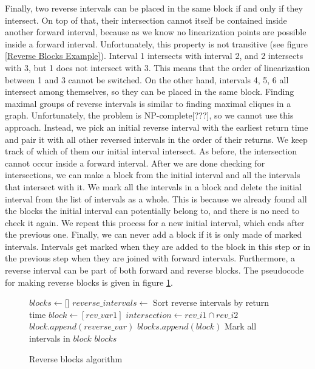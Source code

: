 \documentclass[oneside, a4paper, onecolumn, 10pt]{article}
\begin{document}
\noindent
Finally, two reverse intervals can be placed in the same block if and only if they intersect. On top of that, their intersection cannot itself be contained inside another forward interval, because as we know no linearization points are possible inside a forward interval. Unfortunately, this property is not transitive (see figure \ref{Reverse Blocks Example}). Interval 1 intersects with interval 2, and 2 intersects with 3, but 1 does not intersect with 3. This means that the order of linearization between 1 and 3 cannot be switched. On the other hand, intervals 4, 5, 6 all intersect among themselves, so they can be placed in the same block. Finding maximal groups of reverse intervals is similar to finding maximal cliques in a graph. Unfortunately, the problem is NP-complete[???], so we cannot use this approach.
Instead, we pick an initial reverse interval with the earliest return time and pair it with all other reversed intervals in the order of their returns. We keep track of which of them our initial interval intersect. As before, the intersection cannot occur inside a forward interval. After we are done checking for intersections, we can make a block from the initial interval and all the intervals that intersect with it. We mark all the intervals in a block and delete the initial interval from the list of intervals as a whole. This is because we already found all the blocks the initial interval can potentially belong to, and there is no need to check it again. We repeat this process for a new initial interval, which ends after the previous one. Finally, we can never add a block if it is only made of marked intervals. Intervals get marked when they are added to the block in this step or in the previous step when they are joined with forward intervals. Furthermore, a reverse interval can be part of both forward and reverse blocks. The pseudocode for making reverse blocks is given in figure \ref{Reverse Blocks Algorithm}.
\begin{figure}[h]
  \begin{algorithmic}
    \State $blocks \gets \texttt{[]}$
    \State $reverse\_intervals \gets$ Sort reverse intervals by return time
    \State $block \gets [rev\_var1]$
    \State $intersection \gets rev\_i1 \cap rev\_i2$
    \State $block.append(reverse\_var)$
    \EndIf
    \EndFor
    \State $blocks.append(block)$
    \State Mark all intervals in $block$
    \EndIf
    \EndFor
    \State \Return $blocks$
    \EndFunction
  \end{algorithmic}
  \label{Reverse Blocks Algorithm}
  \caption{Reverse blocks algorithm}
\end{figure}
\end{document}
